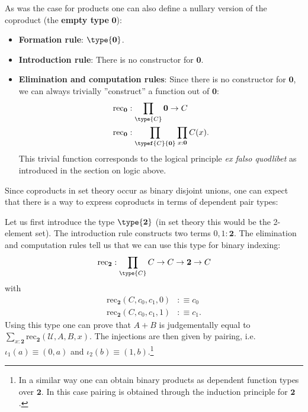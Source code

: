 {        As was the case for products one can also define a nullary version of the coproduct (the \textbf{empty type} $\mathbf{0}$):
        \begin{itemize}
            \item \textbf{Formation rule}: $\type{\mathbf{0}}$.
            \item \textbf{Introduction rule}: There is no constructor for $\mathbf{0}$.
            \item \textbf{Elimination and computation rules}: Since there is no constructor for $\mathbf{0}$, we can always trivially ''construct'' a function out of $\mathbf{0}$:
            \begin{align}
                \text{rec}_{\mathbf{0}}&:\prod_{\type{C}}\mathbf{0}\rightarrow C\\
                \text{rec}_{\mathbf{0}}&:\prod_{\typef{C}{\mathbf{0}}}\prod_{x:\mathbf{0}}C(x).
            \end{align}
            This trivial function corresponds to the logical principle \textit{ex falso quodlibet} as introduced in the section on logic above.
        \end{itemize}
    }

    Since coproducts in set theory occur as binary disjoint unions, one can expect that there is a way to express coproducts in terms of dependent pair types:
    \begin{construct}
        Let us first introduce the type $\type{\mathbf{2}}$ (in set theory this would be the 2-element set). The introduction rule constructs two terms $0,1:\mathbf{2}$. The elimination and computation rules tell us that we can use this type for binary indexing:
        \begin{gather}
            \text{rec}_{\mathbf{2}}:\prod_{\type{C}}C\rightarrow C\rightarrow\mathbf{2}\rightarrow C
        \end{gather}
        with
        \begin{align}
            \text{rec}_{\mathbf{2}}(C, c_0, c_1, 0)&:\equiv c_0\\
            \text{rec}_{\mathbf{2}}(C, c_0, c_1, 1)&:\equiv c_1.
        \end{align}
        Using this type one can prove that $A+B$ is judgementally equal to $\sum_{x:\mathbf{2}}\text{rec}_{\mathbf{2}}(\mathcal{U}, A, B, x)$. The injections are then given by pairing, i.e. $\iota_1(a)\equiv(0, a)$ and $\iota_2(b)\equiv(1, b)$.\footnote{In a similar way one can obtain binary products as dependent function types over $\mathbf{2}$. In this case pairing is obtained through the induction principle for $\mathbf{2}$.}
    \end{construct}

